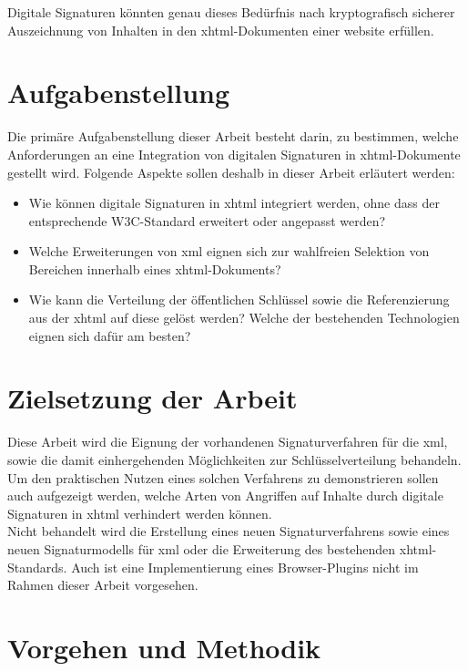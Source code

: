 Digitale Signaturen könnten genau dieses Bedürfnis nach kryptografisch sicherer Auszeichnung von Inhalten in den \gls{xhtml}-Dokumenten einer \gls{website}
erfüllen.

\section{Aufgabenstellung}
%
\label{sec:Einleitung:aufgabenstellung}
Die primäre Aufgabenstellung dieser Arbeit besteht darin, zu bestimmen, welche Anforderungen an eine Integration von digitalen Signaturen in
\gls{xhtml}-Dokumente gestellt wird. Folgende Aspekte sollen deshalb in dieser Arbeit erläutert werden:
\begin{itemize}
    \item Wie können digitale Signaturen in \gls{xhtml} integriert werden, ohne dass der entsprechende W3C-Standard\cite{xhtml:w3c} erweitert oder angepasst
    werden?
    \item Welche Erweiterungen von \gls{xml} eignen sich zur wahlfreien Selektion von Bereichen innerhalb eines \gls{xhtml}-Dokuments?
    \item Wie kann die Verteilung der öffentlichen Schlüssel sowie die Referenzierung aus der \gls{xhtml} auf diese gelöst werden? Welche der bestehenden
    Technologien eignen sich dafür am besten?
\end{itemize}

\section{Zielsetzung der Arbeit}
\label{sec:Einleitung:ziele}
Diese Arbeit wird die Eignung der vorhandenen Signaturverfahren für die \gls{xml}, sowie die damit einhergehenden Möglichkeiten zur Schlüsselverteilung
behandeln. Um den praktischen Nutzen eines solchen Verfahrens zu demonstrieren sollen auch aufgezeigt werden, welche Arten von Angriffen auf Inhalte durch
digitale Signaturen in \gls{xhtml} verhindert werden können.\\

Nicht behandelt wird die Erstellung eines neuen Signaturverfahrens sowie eines neuen Signaturmodells für \gls{xml} oder die Erweiterung des bestehenden
\gls{xhtml}-Standards. Auch ist eine Implementierung eines Browser-Plugins nicht im Rahmen dieser Arbeit vorgesehen.

\section{Vorgehen und Methodik}
\label{sec:Einleitung:methodik}


